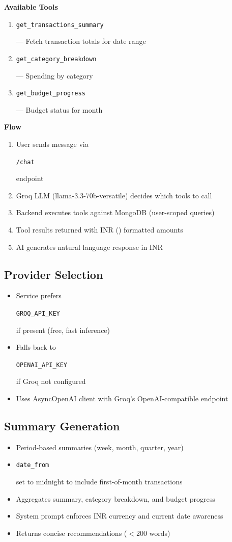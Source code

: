 \documentclass[11pt,a4paper]{article}
\newcommand{\code}[1]{\colorbox{codebg}{\strut\texttt{\small #1}}}
\begin{document}
\textbf{Available Tools}
\begin{enumerate}[leftmargin=*,itemsep=1pt]
  \item \code{get\_transactions\_summary} --- Fetch transaction totals for date range
  \item \code{get\_category\_breakdown} --- Spending by category
  \item \code{get\_budget\_progress} --- Budget status for month
\end{enumerate}

\textbf{Flow}
\begin{enumerate}[leftmargin=*,itemsep=1pt]
  \item User sends message via \code{/chat} endpoint
  \item Groq LLM (llama-3.3-70b-versatile) decides which tools to call
  \item Backend executes tools against MongoDB (user-scoped queries)
  \item Tool results returned with INR (\rupee) formatted amounts
  \item AI generates natural language response in INR
\end{enumerate}

\subsection{Provider Selection}
\begin{itemize}[leftmargin=*,itemsep=1pt]
  \item Service prefers \code{GROQ\_API\_KEY} if present (free, fast inference)
  \item Falls back to \code{OPENAI\_API\_KEY} if Groq not configured
  \item Uses AsyncOpenAI client with Groq's OpenAI-compatible endpoint
\end{itemize}

\subsection{Summary Generation}
\begin{itemize}[leftmargin=*,itemsep=1pt]
  \item Period-based summaries (week, month, quarter, year)
  \item \code{date\_from} set to midnight to include first-of-month transactions
  \item Aggregates summary, category breakdown, and budget progress
  \item System prompt enforces INR currency and current date awareness
  \item Returns concise recommendations ($<$200 words)
\end{itemize}
\end{document}
